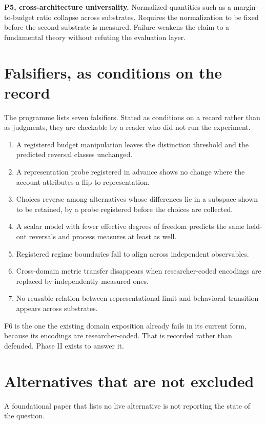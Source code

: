 \documentclass[11pt,letterpaper]{article}
\theoremstyle{plain}
\theoremstyle{definition}
\begin{document}
\textbf{P5, cross-architecture universality.} Normalized quantities such as a
margin-to-budget ratio collapse across substrates. Requires the normalization to
be fixed before the second substrate is measured. Failure weakens the claim to a
fundamental theory without refuting the evaluation layer.

\section{Falsifiers, as conditions on the record}

The programme lists seven falsifiers. Stated as conditions on a record rather
than as judgments, they are checkable by a reader who did not run the
experiment.

\begin{enumerate}[label=F\arabic*.]
\item A registered budget manipulation leaves the distinction threshold and the
predicted reversal classes unchanged.
\item A representation probe registered in advance shows no change where the
account attributes a flip to representation.
\item Choices reverse among alternatives whose differences lie in a subspace
shown to be retained, by a probe registered before the choices are collected.
\item A scalar model with fewer effective degrees of freedom predicts the same
held-out reversals and process measures at least as well.
\item Registered regime boundaries fail to align across independent observables.
\item Cross-domain metric transfer disappears when researcher-coded encodings
are replaced by independently measured ones.
\item No reusable relation between representational limit and behavioral
transition appears across substrates.
\end{enumerate}

F6 is the one the existing domain exposition already fails in its current form,
because its encodings are researcher-coded. That is recorded rather than
defended. Phase II exists to answer it.

\section{Alternatives that are not excluded}

A foundational paper that lists no live alternative is not reporting the state
of the question.
\end{document}
